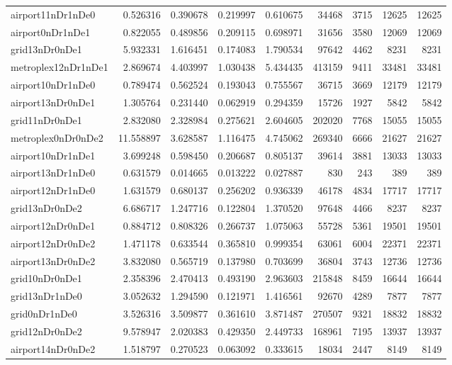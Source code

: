 \begin{longtable}{|l|r|r|r|r|r|r|r|r|}
airport11nDr1nDe0 & 0.526316 & 0.390678 & 0.219997 & 0.610675 & 34468 & 3715 & 12625 & 12625 \\
airport0nDr1nDe1 & 0.822055 & 0.489856 & 0.209115 & 0.698971 & 31656 & 3580 & 12069 & 12069 \\
grid13nDr0nDe1 & 5.932331 & 1.616451 & 0.174083 & 1.790534 & 97642 & 4462 & 8231 & 8231 \\
metroplex12nDr1nDe1 & 2.869674 & 4.403997 & 1.030438 & 5.434435 & 413159 & 9411 & 33481 & 33481 \\
airport10nDr1nDe0 & 0.789474 & 0.562524 & 0.193043 & 0.755567 & 36715 & 3669 & 12179 & 12179 \\
airport13nDr0nDe1 & 1.305764 & 0.231440 & 0.062919 & 0.294359 & 15726 & 1927 & 5842 & 5842 \\
grid11nDr0nDe1 & 2.832080 & 2.328984 & 0.275621 & 2.604605 & 202020 & 7768 & 15055 & 15055 \\
metroplex0nDr0nDe2 & 11.558897 & 3.628587 & 1.116475 & 4.745062 & 269340 & 6666 & 21627 & 21627 \\
airport10nDr1nDe1 & 3.699248 & 0.598450 & 0.206687 & 0.805137 & 39614 & 3881 & 13033 & 13033 \\
airport13nDr1nDe0 & 0.631579 & 0.014665 & 0.013222 & 0.027887 & 830 & 243 & 389 & 389 \\
airport12nDr1nDe0 & 1.631579 & 0.680137 & 0.256202 & 0.936339 & 46178 & 4834 & 17717 & 17717 \\
grid13nDr0nDe2 & 6.686717 & 1.247716 & 0.122804 & 1.370520 & 97648 & 4466 & 8237 & 8237 \\
airport12nDr0nDe1 & 0.884712 & 0.808326 & 0.266737 & 1.075063 & 55728 & 5361 & 19501 & 19501 \\
airport12nDr0nDe2 & 1.471178 & 0.633544 & 0.365810 & 0.999354 & 63061 & 6004 & 22371 & 22371 \\
airport13nDr0nDe2 & 3.832080 & 0.565719 & 0.137980 & 0.703699 & 36804 & 3743 & 12736 & 12736 \\
grid10nDr0nDe1 & 2.358396 & 2.470413 & 0.493190 & 2.963603 & 215848 & 8459 & 16644 & 16644 \\
grid13nDr1nDe0 & 3.052632 & 1.294590 & 0.121971 & 1.416561 & 92670 & 4289 & 7877 & 7877 \\
grid0nDr1nDe0 & 3.526316 & 3.509877 & 0.361610 & 3.871487 & 270507 & 9321 & 18832 & 18832 \\
grid12nDr0nDe2 & 9.578947 & 2.020383 & 0.429350 & 2.449733 & 168961 & 7195 & 13937 & 13937 \\
airport14nDr0nDe2 & 1.518797 & 0.270523 & 0.063092 & 0.333615 & 18034 & 2447 & 8149 & 8149 \\

\end{longtable}
